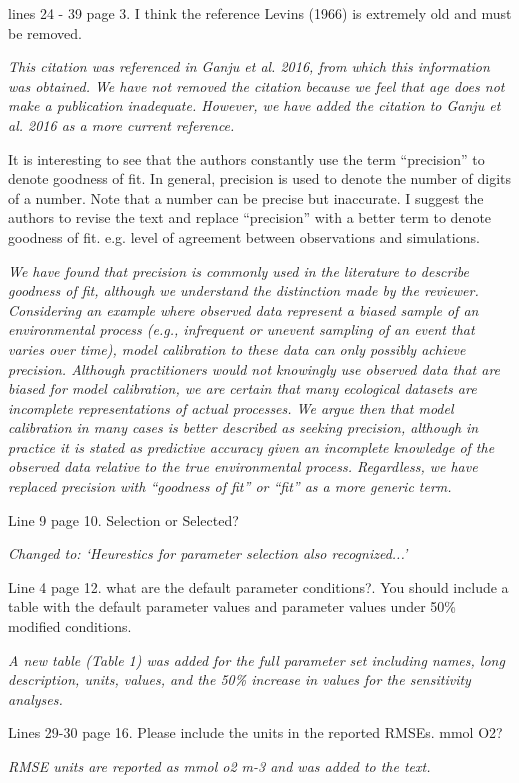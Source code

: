 \documentclass[letterpaper,12pt]{article}\usepackage[]{graphicx}\usepackage[]{color}
\begin{document}
lines 24 - 39 page 3. I think the reference Levins (1966) is extremely old and must be removed. 

{\it This citation was referenced in Ganju et al. 2016, from which this information was obtained.  We have not removed the citation because we feel that age does not make a publication inadequate.  However, we have added the citation to Ganju et al. 2016 as a more current reference.}

It is interesting to see that the authors constantly use the term ``precision'' to denote goodness of fit. In general, precision is used to denote the number of digits of a number. Note that a number can be precise but inaccurate. I suggest the authors to revise the text and replace ``precision'' with a better term to denote goodness of fit. e.g. level of agreement between observations and simulations. 

{\it We have found that precision is commonly used in the literature to describe goodness of fit, although we understand the distinction made by the reviewer.  Considering an example where observed data represent a biased sample of an environmental process (e.g., infrequent or unevent sampling of an event that varies over time), model calibration to these data can only possibly achieve precision.  Although practitioners would not knowingly use observed data that are biased for model calibration, we are certain that many ecological datasets are incomplete representations of actual processes.  We argue then that model calibration in many cases is better described as seeking precision, although in practice it is stated as predictive accuracy given an incomplete knowledge of the observed data relative to the true environmental process. Regardless, we have replaced precision with ``goodness of fit'' or ``fit'' as a more generic term.}

Line 9 page 10. Selection or Selected?

{\it Changed to: `Heurestics for parameter selection also recognized...'}

Line 4 page 12. what are the default parameter conditions?. You should include a table with the default parameter values and parameter values under 50\% modified conditions. 

{\it A new table (Table 1) was added for the full parameter set including names, long description, units, values, and the 50\% increase in values for the sensitivity analyses.}

Lines 29-30 page 16. Please include the units in the reported RMSEs. mmol O2?

{\it RMSE units are reported as mmol o2 m-3 and was added to the text.}
\end{document}
